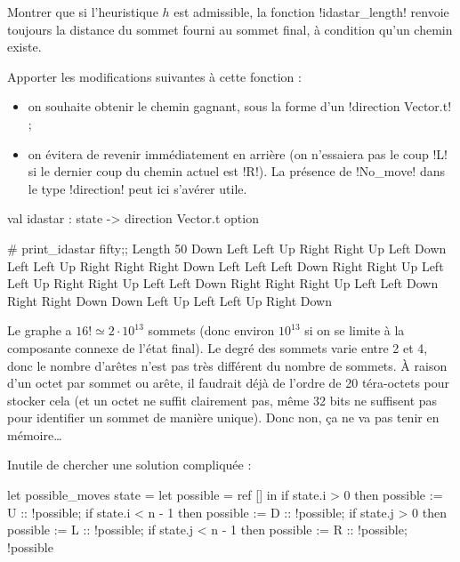 \begin{ques}
  Montrer que si l'heuristique $h$ est admissible, la
  fonction \ml!idastar_length! renvoie toujours la distance du sommet
  fourni au sommet final, à condition qu'un chemin existe.
\end{ques}

\begin{ques}
  Apporter les modifications suivantes à cette fonction :
  \begin{itemize}
    \item on souhaite obtenir le chemin gagnant, sous la forme
          d'un \ml!direction Vector.t! ;
    \item on évitera de revenir immédiatement en arrière
          (on n'essaiera pas le coup \ml!L! si le dernier coup
          du chemin actuel est \ml!R!). La présence de \ml!No_move!
          dans le type \ml!direction! peut ici s'avérer utile.
  \end{itemize}
\begin{ocaml}
val idastar : state -> direction Vector.t option
\end{ocaml}
\begin{mlinter}
# print_idastar fifty;;
Length 50
Down Left Left Up Right Right Up Left Down Left Left Up Right
Right Right Down Left Left Left Down Right Right Up Left Left
Up Right Right Up Left Left Down Right Right Right Up Left Left
Down Right Right Down Down Left Up Left Left Up Right Down
\end{mlinter}
\end{ques}

\Solutions

\setcounter{ques}{0}

\begin{ques}
  Le graphe a $16! \simeq 2\cdot 10^{13}$ sommets (donc environ
  $10^{13}$ si on se limite à la composante connexe de l'état final).
  Le degré des sommets varie entre 2 et 4, donc le nombre d'arêtes
  n'est pas très différent du nombre de sommets. À raison d'un octet
  par sommet ou arête, il faudrait déjà de l'ordre de 20 téra-octets
  pour stocker cela (et un octet ne suffit clairement pas, même 32 bits
  ne suffisent pas pour identifier un sommet de manière unique).
  Donc non, ça ne va pas tenir en mémoire\dots
\end{ques}

\begin{ques}
  Inutile de chercher une solution compliquée :
\begin{ocaml}
let possible_moves state =
  let possible = ref [] in
  if state.i > 0 then possible := U :: !possible;
  if state.i < n - 1 then possible := D :: !possible;
  if state.j > 0 then possible := L :: !possible;
  if state.j < n - 1 then possible := R :: !possible;
  !possible
\end{ocaml}
\end{ques}

